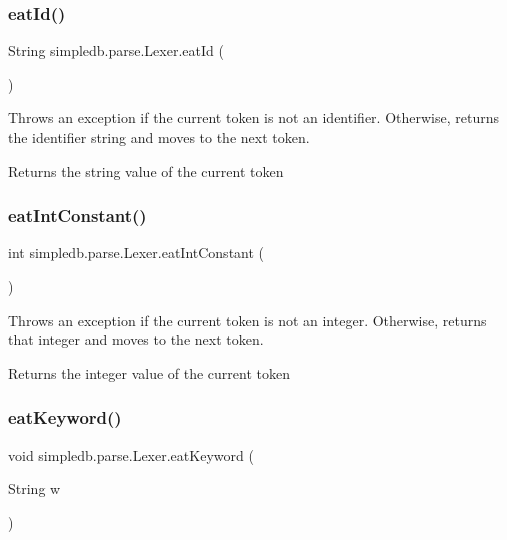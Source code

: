 \subsubsection{\texorpdfstring{eat\+Id()}{eatId()}}
{\footnotesize\ttfamily String simpledb.\+parse.\+Lexer.\+eat\+Id (\begin{DoxyParamCaption}{ }\end{DoxyParamCaption})\hspace{0.3cm}{\ttfamily [inline]}}

Throws an exception if the current token is not an identifier. Otherwise, returns the identifier string and moves to the next token. \begin{DoxyReturn}{Returns}
the string value of the current token 
\end{DoxyReturn}
\mbox{\label{classsimpledb_1_1parse_1_1Lexer_a21315c8461ce8cf2b8de369252c12270}} 
\subsubsection{\texorpdfstring{eat\+Int\+Constant()}{eatIntConstant()}}
{\footnotesize\ttfamily int simpledb.\+parse.\+Lexer.\+eat\+Int\+Constant (\begin{DoxyParamCaption}{ }\end{DoxyParamCaption})\hspace{0.3cm}{\ttfamily [inline]}}

Throws an exception if the current token is not an integer. Otherwise, returns that integer and moves to the next token. \begin{DoxyReturn}{Returns}
the integer value of the current token 
\end{DoxyReturn}
\mbox{\label{classsimpledb_1_1parse_1_1Lexer_a636868ec2864b11d552fe39180deea5f}} 
\subsubsection{\texorpdfstring{eat\+Keyword()}{eatKeyword()}}
{\footnotesize\ttfamily void simpledb.\+parse.\+Lexer.\+eat\+Keyword (\begin{DoxyParamCaption}\item[{String}]{w }\end{DoxyParamCaption})\hspace{0.3cm}{\ttfamily [inline]}}

